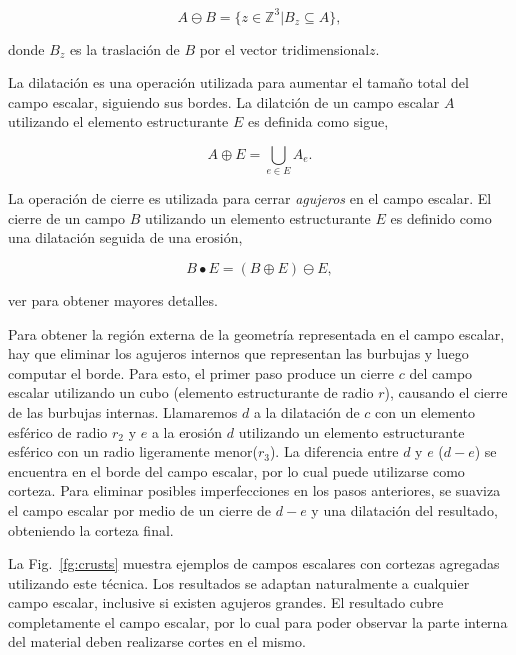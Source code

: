 \begin{equation}
A \ominus B = \{z\in \mathbb{Z}^3 | B_{z} \subseteq A\},
\end{equation}

\noindent donde $B_{z}$ es la traslación de $B$ por el vector tridimensional$z$.

La dilatación es una operación utilizada para aumentar el tamaño total del campo escalar, siguiendo sus bordes.
La dilatción de un campo escalar $A$ utilizando el elemento estructurante $E$ es definida como sigue,

\begin{equation}
A  \oplus E = \bigcup_{e\in E} A_e.
\end{equation}

La operación de cierre es utilizada para cerrar {\em agujeros} en el campo escalar.
El cierre de un campo $B$ utilizando un elemento estructurante $E$ es definido como una dilatación seguida de una erosión,

\begin{equation}
B \bullet E = (B \oplus E) \ominus E,
\end{equation}

ver \cite{Gonzalez2001} para obtener mayores detalles.

Para obtener la región externa de la geometría representada en el campo escalar, hay que eliminar los agujeros internos que representan las burbujas y luego computar el borde.
Para esto, el primer paso produce un cierre $c$ del campo escalar utilizando un cubo (elemento estructurante de radio $r$), causando el cierre de las burbujas internas.
Llamaremos $d$ a la dilatación de $c$ con un elemento esférico de radio $r_{2}$ y $e$ a la erosión $d$ utilizando un elemento estructurante esférico con un radio ligeramente menor($r_{3}$).
La diferencia entre $d$ y $e$ ($d-e$) se encuentra en el borde del campo escalar, por lo cual puede utilizarse como corteza.
Para eliminar posibles imperfecciones en los pasos anteriores, se suaviza el campo escalar por medio de un cierre de $d-e$ y una dilatación del resultado, obteniendo la corteza final.


La Fig.~\ref{fg:crusts} muestra ejemplos de campos escalares con cortezas agregadas utilizando este técnica. Los resultados se adaptan naturalmente a cualquier campo escalar, inclusive si existen agujeros grandes.
El resultado cubre completamente el campo escalar, por lo cual para poder observar la parte interna del material deben realizarse cortes en el mismo.

